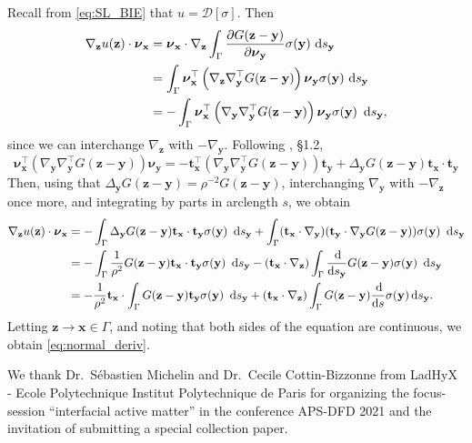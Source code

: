 \documentclass[prb,preprint,showpacs,preprintnumbers,amsmath,amssymb,longbibliography]{revtex4-1}
\newcommand{\nnu}{\boldsymbol{\nu}}
\newcommand{\xx}{\mathbf{x}}
\newcommand{\zz}{\mathbf{z}}
\newcommand{\yy}{\mathbf{y}}
\renewcommand{\tt}{\mathbf{t}}
\begin{document}
Recall from \eqref{eq:SL_BIE} that $u = \mathcal{D}[\sigma]$.
Then  
\begin{align*}
\nabla_{\zz} u(\zz) \cdot \nnu_{\xx}
&=\nnu_\xx \cdot \nabla_\zz \int_\Gamma \frac{\partial G(\zz-\yy)}{\partial \nnu_\yy}\sigma(\yy) \,\dif s_\yy\\
&=\int_\Gamma \nnu_\xx^\top \left(\nabla_\zz\nabla_\yy^\top  G(\zz-\yy)\right) \nnu_\yy\sigma(\yy)  \,\dif s_\yy\\
  &=-\int_\Gamma \nnu_\xx^\top \left(\nabla_\yy\nabla_\yy^\top G(\zz-\yy)\right)\nnu_\yy\sigma(\yy)\ \dif s_\yy,
\end{align*}
since we can interchange $\nabla_\zz$ with $-\nabla_\yy$.
Following \cite{Hsiao2008}, \S 1.2,
\[
\nnu_\xx^\top \left(\nabla_\yy\nabla_\yy^\top G(\zz-\yy)\right)\nnu_\yy
=
-\tt_{\xx}^\top \left(\nabla_\yy\nabla_\yy^\top G(\zz-\yy)\right)\tt_{\yy}
+ \Delta_{\yy}G(\zz-\yy) \tt_{\xx}\cdot \tt_{\yy}
\]
Then, using that $\Delta_{\yy} G(\zz-\yy) = \rho^{-2} G(\zz-\yy)$,
interchanging $\nabla_\yy$ with $-\nabla_\zz$ once more,
and integrating by parts in arclength $s$,
we obtain 
\begin{align*}
\nabla_{\zz} u(\zz) \cdot \nnu_{\xx}
&=-\int_\Gamma  \Delta_\yy G(\zz-\yy) {\bf t}_\xx \cdot   {\bf t}_\yy \sigma(\yy)\ \dif s_\yy
+\int_\Gamma({\bf t}_\xx\cdot\nabla_\yy)({\bf t}_\yy\cdot\nabla_\yy G(\zz-\yy))\sigma(\yy)\ \dif s_\yy\\
&= -\int_\Gamma \frac{1}{\rho^{2}} G(\zz-\yy) {\bf t}_\xx \cdot {\bf t}_\yy \sigma(\yy)\ \dif s_\yy  
-({\bf t}_\xx\cdot\nabla_\zz)\int_\Gamma \frac{\dif}{\dif s_\yy}G(\zz-\yy) \sigma(\yy)\ \dif s_\yy\\
&= -\frac{1}{\rho^2} {\bf t}_\xx\cdot \int_\Gamma G(\zz-\yy){\bf t}_\yy \sigma(\yy)\ \dif s_\yy + 
({\bf t}_\xx \cdot \nabla_\zz)\int_\Gamma G(\zz-\yy)\frac{\dif }{\dif s} \sigma(\yy)  \dif s_\yy.
\end{align*}
%
Letting $\zz\to\xx\in\Gamma$, and noting that both sides of the equation are continuous,
we obtain \eqref{eq:normal_deriv}.


\begin{acknowledgments}
We thank Dr.~S\'ebastien Michelin and Dr.~Cecile Cottin-Bizzonne from LadHyX - Ecole Polytechnique Institut Polytechnique de Paris for organizing the focus-session ``interfacial active matter'' in the conference APS-DFD 2021 and the invitation of submitting a special collection paper. 

\end{acknowledgments}


\end{document}
